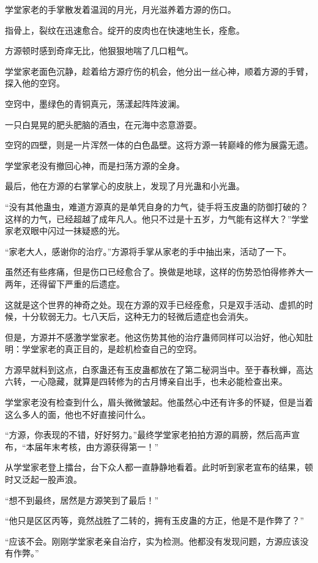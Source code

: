 \begin{this_body}
学堂家老的手掌散发着温润的月光，月光滋养着方源的伤口。

指骨上，裂纹在迅速愈合。绽开的皮肉也在快速地生长，痊愈。

方源顿时感到奇痒无比，他狠狠地喘了几口粗气。

学堂家老面色沉静，趁着给方源疗伤的机会，他分出一丝心神，顺着方源的手臂，探入他的空窍。

空窍中，墨绿色的青铜真元，荡漾起阵阵波澜。

一只白晃晃的肥头肥脑的酒虫，在元海中恣意游耍。

空窍的四壁，则是一片浑然一体的白色晶壁。这将方源一转巅峰的修为展露无遗。

学堂家老没有撤回心神，而是扫荡方源的全身。

最后，他在方源的右掌掌心的皮肤上，发现了月光蛊和小光蛊。

“没有其他蛊虫，难道方源真的是单凭自身的力气，徒手将玉皮蛊的防御打破的？这样的力气，已经超越了成年凡人。他只不过是十五岁，力气能有这样大？”学堂家老双眼中闪过一抹疑惑的光。

“家老大人，感谢你的治疗。”方源将手掌从家老的手中抽出来，活动了一下。

虽然还有些疼痛，但是伤口已经愈合了。换做是地球，这样的伤势恐怕得修养大一两年，还得留下严重的后遗症。

这就是这个世界的神奇之处。现在方源的双手已经痊愈，只是双手活动、虚抓的时候，十分软弱无力。七八天后，这种无力的轻微后遗症也会消失。

但是，方源并不感激学堂家老。他这伤势其他的治疗蛊师同样可以治好，他心知肚明：学堂家老的真正目的，是趁机检查自己的空窍。

方源早就料到这点，白豕蛊还有玉皮蛊都放在了第二秘洞当中。至于春秋蝉，高达六转，一心隐藏，就算是四转修为的古月博亲自出手，也未必能检查出来。

学堂家老没有检查到什么，眉头微微皱起。他虽然心中还有许多的怀疑，但是当着这么多人的面，他也不好直接问什么。

“方源，你表现的不错，好好努力。”最终学堂家老拍拍方源的肩膀，然后高声宣布，“本届年末考核，由方源获得第一！”

从学堂家老登上擂台，台下众人都一直静静地看着。此时听到家老宣布的结果，顿时又泛起一股声浪。

“想不到最终，居然是方源笑到了最后！”

“他只是区区丙等，竟然战胜了二转的，拥有玉皮蛊的方正，他是不是作弊了？”

“应该不会。刚刚学堂家老亲自治疗，实为检测。他都没有发现问题，方源应该没有作弊。”


\end{this_body}
